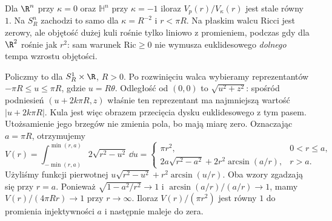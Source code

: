 \begin{przyklad}
Dla $\R^n$ przy $\kappa=0$ oraz
$\mathbb H^n$ przy $\kappa=-1$ iloraz
$V_p(r)/V_\kappa(r)$ jest stale równy $1$.
Na $S_R^n$ zachodzi to samo dla
$\kappa=R^{-2}$ i $r<\pi R$.
Na płaskim walcu Ricci jest zerowy, ale
objętość dużej kuli rośnie tylko liniowo
z promieniem, podczas gdy dla $\R^2$
rośnie jak $r^2$: sam warunek $\mathrm{Ric}\geq0$
nie wymusza euklidesowego \emph{dolnego}
tempa wzrostu objętości.

Policzmy to dla $S_R^1\times\R$, $R>0$.
Po rozwinięciu walca wybieramy reprezentantów
$-\pi R\leq u\leq\pi R$, gdzie $u=R\theta$.
Odległość od $(0,0)$ to $\sqrt{u^2+z^2}$:
spośród podniesień $(u+2k\pi R,z)$ właśnie ten
reprezentant ma najmniejszą wartość $|u+2k\pi R|$.
Kula jest więc obrazem przecięcia dysku euklidesowego
z tym pasem. Utożsamienie jego brzegów nie zmienia pola,
bo mają miarę zero. Oznaczając $a=\pi R$, otrzymujemy
\[
 V(r)=\int_{-\min(r,a)}^{\min(r,a)}2\sqrt{r^2-u^2}\,\dd u
 =\begin{cases}
   \pi r^2,&0<r\leq a,\\
   2a\sqrt{r^2-a^2}+2r^2\arcsin(a/r),&r>a.
  \end{cases}
\]
Użyliśmy funkcji pierwotnej
$u\sqrt{r^2-u^2}+r^2\arcsin(u/r)$.
Oba wzory zgadzają się przy $r=a$.
Ponieważ $\sqrt{1-a^2/r^2}\to1$ i
$\arcsin(a/r)/(a/r)\to1$, mamy
$V(r)/(4\pi Rr)\to1$ przy $r\to\infty$.
Iloraz $V(r)/(\pi r^2)$ jest równy $1$ do promienia
injektywności $a$ i następnie maleje do zera.
\end{przyklad}

